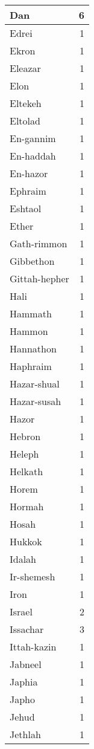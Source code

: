 \begin{center}
\begin{longtable}{l|r}
Dan & 6\\ \hline 
Edrei & 1\\ \hline 
Ekron & 1\\ \hline 
Eleazar & 1\\ \hline 
Elon & 1\\ \hline 
Eltekeh & 1\\ \hline 
Eltolad & 1\\ \hline 
En-gannim & 1\\ \hline 
En-haddah & 1\\ \hline 
En-hazor & 1\\ \hline 
Ephraim & 1\\ \hline 
Eshtaol & 1\\ \hline 
Ether & 1\\ \hline 
Gath-rimmon & 1\\ \hline 
Gibbethon & 1\\ \hline 
Gittah-hepher & 1\\ \hline 
Hali & 1\\ \hline 
Hammath & 1\\ \hline 
Hammon & 1\\ \hline 
Hannathon & 1\\ \hline 
Haphraim & 1\\ \hline 
Hazar-shual & 1\\ \hline 
Hazar-susah & 1\\ \hline 
Hazor & 1\\ \hline 
Hebron & 1\\ \hline 
Heleph & 1\\ \hline 
Helkath & 1\\ \hline 
Horem & 1\\ \hline 
Hormah & 1\\ \hline 
Hosah & 1\\ \hline 
Hukkok & 1\\ \hline 
Idalah & 1\\ \hline 
Ir-shemesh & 1\\ \hline 
Iron & 1\\ \hline 
Israel & 2\\ \hline 
Issachar & 3\\ \hline 
Ittah-kazin & 1\\ \hline 
Jabneel & 1\\ \hline 
Japhia & 1\\ \hline 
Japho & 1\\ \hline 
Jehud & 1\\ \hline 
Jethlah & 1\\ \hline 

\end{longtable}
\end{center}

